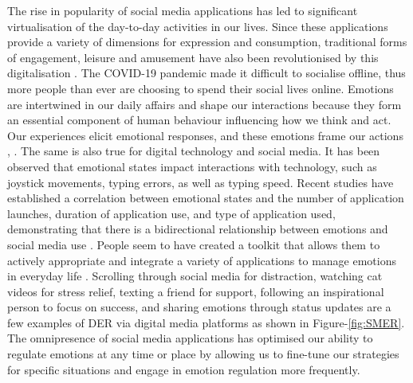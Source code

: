 The rise in popularity of social media applications has led to significant virtualisation of the day-to-day activities in our lives. Since these applications provide a variety of dimensions for expression and consumption, traditional forms of engagement, leisure and amusement have also been revolutionised by this digitalisation \cite{schull2012addiction}. The COVID-19 pandemic made it difficult to socialise offline, thus more people than ever are choosing to spend their social lives online. Emotions are intertwined in our daily affairs and shape our interactions because they form an essential component of human behaviour influencing how we think and act. Our experiences elicit emotional responses, and these emotions frame our actions \cite{gross1998emerging}, \cite{gross2015emotion}. The same is also true for digital technology and social media. It has been observed that emotional states impact interactions with technology, such as joystick movements, typing errors, as well as typing speed. Recent studies have established a correlation between emotional states and the number of application launches, duration of application use, and type of application used, demonstrating that there is a bidirectional relationship between emotions and social media use \cite{sarsenbayeva2020does}. People seem to have created a toolkit that allows them to actively appropriate and integrate a variety of applications to manage emotions in everyday life \cite{smith2022digital}. Scrolling through social media for distraction, watching cat videos for stress relief, texting a friend for support, following an inspirational person to focus on success, and sharing emotions through status updates are a few examples of DER via digital media platforms as shown in Figure-\ref{fig:SMER}. The omnipresence of social media applications has optimised our ability to regulate emotions at any time or place by allowing us to fine-tune our strategies for specific situations and engage in emotion regulation more frequently.

